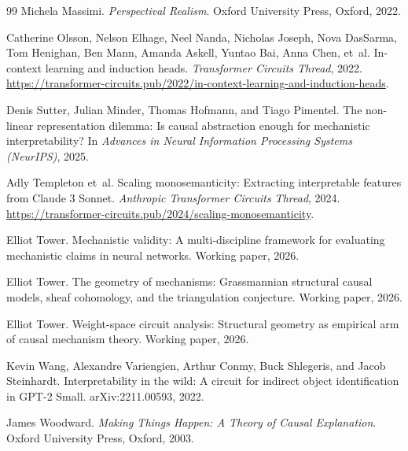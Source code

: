 \documentclass[11pt]{article}
\theoremstyle{remark}
\begin{document}
\begin{thebibliography}{99}
Michela Massimi.
\newblock \emph{Perspectival Realism}.
\newblock Oxford University Press, Oxford, 2022.

Catherine Olsson, Nelson Elhage, Neel Nanda, Nicholas Joseph, Nova DasSarma,
  Tom Henighan, Ben Mann, Amanda Askell, Yuntao Bai, Anna Chen, et~al.
\newblock In-context learning and induction heads.
\newblock \emph{Transformer Circuits Thread}, 2022.
\newblock \url{https://transformer-circuits.pub/2022/in-context-learning-and-induction-heads}.

Denis Sutter, Julian Minder, Thomas Hofmann, and Tiago Pimentel.
\newblock The non-linear representation dilemma: Is causal abstraction enough
  for mechanistic interpretability?
\newblock In \emph{Advances in Neural Information Processing Systems
  (NeurIPS)}, 2025.

Adly Templeton et~al.
\newblock Scaling monosemanticity: Extracting interpretable features from
  {Claude 3 Sonnet}.
\newblock \emph{Anthropic Transformer Circuits Thread}, 2024.
\newblock \url{https://transformer-circuits.pub/2024/scaling-monosemanticity}.

Elliot Tower.
\newblock Mechanistic validity: A multi-discipline framework for evaluating
  mechanistic claims in neural networks.
\newblock Working paper, 2026.

Elliot Tower.
\newblock The geometry of mechanisms: {G}rassmannian structural causal models,
  sheaf cohomology, and the triangulation conjecture.
\newblock Working paper, 2026.

Elliot Tower.
\newblock Weight-space circuit analysis: Structural geometry as empirical arm
  of causal mechanism theory.
\newblock Working paper, 2026.

Kevin Wang, Alexandre Variengien, Arthur Conmy, Buck Shlegeris, and Jacob
  Steinhardt.
\newblock Interpretability in the wild: A circuit for indirect object
  identification in {GPT-2 Small}.
\newblock arXiv:2211.00593, 2022.

James Woodward.
\newblock \emph{Making Things Happen: A Theory of Causal Explanation}.
\newblock Oxford University Press, Oxford, 2003.

\end{thebibliography}
\end{document}
